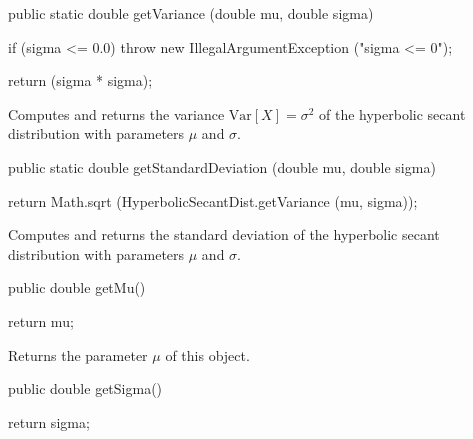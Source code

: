 \begin{htmlonly}
\end{htmlonly}
\begin{code}

   public static double getVariance (double mu, double sigma)\begin{hide} {
      if (sigma <= 0.0)
         throw new IllegalArgumentException ("sigma <= 0");

      return (sigma * sigma);
   }\end{hide}
\end{code}
\begin{tabb}  Computes and returns the variance $\mbox{Var}[X] = \sigma^2$
   of the hyperbolic secant distribution with parameters $\mu$ and $\sigma$.
\end{tabb}
\begin{htmlonly}
   \return{the variance of the hyperbolic secant distribution
   $\mbox{Var}[X] = \sigma^2$
\end{htmlonly}
\begin{code}

   public static double getStandardDeviation (double mu, double sigma)\begin{hide} {
      return Math.sqrt (HyperbolicSecantDist.getVariance (mu, sigma));
   }\end{hide}
\end{code}
\begin{tabb}  Computes and returns the standard deviation
   of the hyperbolic secant distribution with parameters
   $\mu$ and $\sigma$.
\end{tabb}
\begin{htmlonly}
\end{htmlonly}
\begin{code}

   public double getMu()\begin{hide} {
      return mu;
   }\end{hide}
\end{code}
 \begin{tabb} Returns the parameter $\mu$ of this object.
 \end{tabb}
\begin{code}

   public double getSigma()\begin{hide} {
      return sigma;
   }\end{hide}
\end{code}
